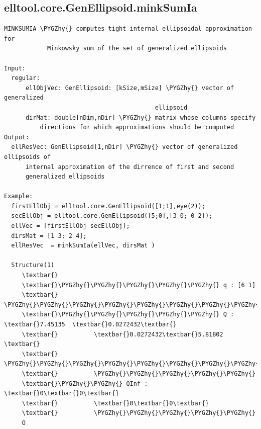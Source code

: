 \documentclass[letterpaper,10pt,english]{sphinxmanual}
\def\PYGZhy{\char`\-}
\begin{document}
\subsection{elltool.core.GenEllipsoid.minkSumIa}
\label{chap_functions:elltool-core-genellipsoid-minksumia}
\begin{Verbatim}[commandchars=\\\{\}]
MINKSUMIA \PYGZhy{} computes tight internal ellipsoidal approximation for
            Minkowsky sum of the set of generalized ellipsoids

Input:
  regular:
      ellObjVec: GenEllipsoid: [kSize,mSize] \PYGZhy{} vector of  generalized
                                          ellipsoid
      dirMat: double[nDim,nDir] \PYGZhy{} matrix whose columns specify
          directions for which approximations should be computed
Output:
  ellResVec: GenEllipsoid[1,nDir] \PYGZhy{} vector of generalized ellipsoids of
      internal approximation of the dirrence of first and second
      generalized ellipsoids

Example:
  firstEllObj = elltool.core.GenEllipsoid([1;1],eye(2));
  secEllObj = elltool.core.GenEllipsoid([5;0],[3 0; 0 2]);
  ellVec = [firstEllObj secEllObj];
  dirsMat = [1 3; 2 4];
  ellResVec  = minkSumIa(ellVec, dirsMat )

  Structure(1)
     \textbar{}
     \textbar{}\PYGZhy{}\PYGZhy{}\PYGZhy{}\PYGZhy{}\PYGZhy{} q : [6 1]
     \textbar{}          \PYGZhy{}\PYGZhy{}\PYGZhy{}\PYGZhy{}\PYGZhy{}\PYGZhy{}\PYGZhy{}\PYGZhy{}\PYGZhy{}\PYGZhy{}\PYGZhy{}\PYGZhy{}\PYGZhy{}\PYGZhy{}\PYGZhy{}\PYGZhy{}\PYGZhy{}\PYGZhy{}\PYGZhy{}\PYGZhy{}\PYGZhy{}
     \textbar{}\PYGZhy{}\PYGZhy{}\PYGZhy{}\PYGZhy{}\PYGZhy{} Q : \textbar{}7.45135  \textbar{}0.0272432\textbar{}
     \textbar{}          \textbar{}0.0272432\textbar{}5.81802  \textbar{}
     \textbar{}          \PYGZhy{}\PYGZhy{}\PYGZhy{}\PYGZhy{}\PYGZhy{}\PYGZhy{}\PYGZhy{}\PYGZhy{}\PYGZhy{}\PYGZhy{}\PYGZhy{}\PYGZhy{}\PYGZhy{}\PYGZhy{}\PYGZhy{}\PYGZhy{}\PYGZhy{}\PYGZhy{}\PYGZhy{}\PYGZhy{}\PYGZhy{}
     \textbar{}          \PYGZhy{}\PYGZhy{}\PYGZhy{}\PYGZhy{}\PYGZhy{}
     \textbar{}\PYGZhy{}\PYGZhy{} QInf : \textbar{}0\textbar{}0\textbar{}
     \textbar{}          \textbar{}0\textbar{}0\textbar{}
     \textbar{}          \PYGZhy{}\PYGZhy{}\PYGZhy{}\PYGZhy{}\PYGZhy{}
     O


\end{Verbatim}
\end{document}
